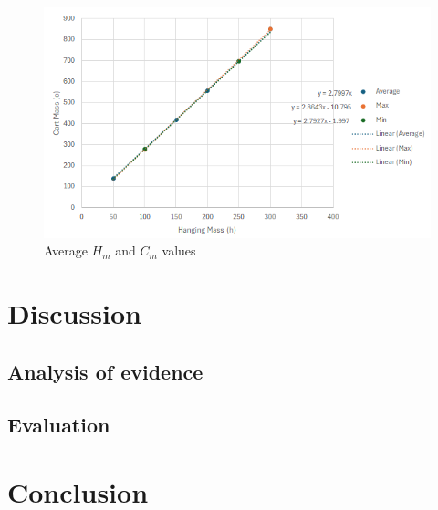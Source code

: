 \documentclass[11pt,a4paper]{article}
\begin{document}
\begin{figure}[H]
\centering
\includegraphics[width=0.8\paperwidth]{results.png}
\caption{Average $H_m$ and $C_m$ values}
\end{figure}




\section{Discussion}
\subsection{Analysis of evidence}


\subsection{Evaluation}


\section{Conclusion}
\newpage



	
\end{document}
